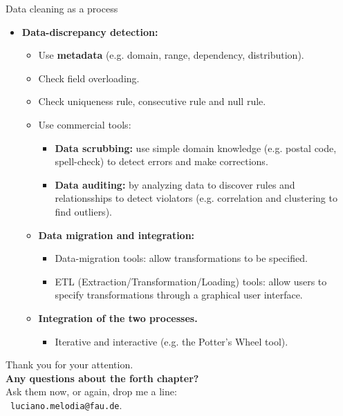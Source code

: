 \documentclass[aspectratio=169,t]{beamer}
\begin{document}
 { 
    \begin{frame}{Data cleaning as a process}
    \begin{itemize}
      \item \textbf{Data-discrepancy detection:}
      \begin{itemize}
        \item Use \textbf{\color{airforceblue}metadata} (e.g. domain, range, dependency, distribution).
        \item Check field overloading.
        \item Check uniqueness rule, consecutive rule and null rule.
        \item Use commercial tools:
        \begin{itemize}
          \item \textbf{\color{airforceblue}Data scrubbing:} use simple domain knowledge (e.g. postal code, spell-check) to detect errors and make corrections.
          \item \textbf{\color{airforceblue}Data auditing:} by analyzing data to discover rules and relationsships to detect violators (e.g. correlation and clustering to find outliers).
        \end{itemize}
        \item \textbf{Data migration and integration:}
        \begin{itemize}
          \item Data-migration tools: allow transformations to be specified.
          \item ETL (Extraction/Transformation/Loading) tools: allow users to specify transformations through a graphical user interface.
        \end{itemize}
        \item \textbf{Integration of the two processes.}
        \begin{itemize}
          \item Iterative and interactive (e.g. the Potter's Wheel tool).
        \end{itemize}
      \end{itemize}
    \end{itemize}
    \end{frame}
  }


  { %
    \begin{frame}[c]
      \begin{center}
        Thank you for your attention.\\
        {\bf Any questions about the forth chapter?}\\[0.5cm]
        Ask them now, or again, drop me a line: \\ 
        \faSendO \ \texttt{luciano.melodia@fau.de}.
      \end{center}
    \end{frame}
  }
\end{document}
